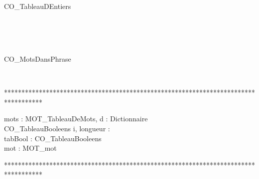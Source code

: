 \begin{algorithme}

\\

\begin{enregistrement}{CO\_TableauDEntiers}
\end{enregistrement}\\

\\

\\

\begin{enregistrement}{CO\_MotsDansPhrase}
\end{enregistrement}\\

\end{algorithme}

***********************************************************************************

\begin{algorithme}
%
	{mots : MOT\_TableauDeMots, d : Dictionnaire}%
	{\\CO\_TableauBooleens}%
	{i, longueur : \naturel \\ tabBool : CO\_TableauBooleens\\ mot : MOT\_mot}%
	{%
	{	
		{
		}%
		{
			}
	}%
	}\\
\end{algorithme}
	
***********************************************************************************

